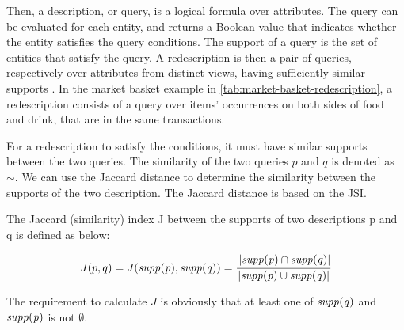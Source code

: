 Then, a description, or query, is a logical formula over attributes.
The query can be evaluated for each entity, and returns a Boolean value that indicates whether the entity satisfies the query conditions.
The support of a query is the set of entities that satisfy the query.
A redescription is then a pair of queries, respectively over attributes from distinct views, having sufficiently similar supports \cite{galbrun2018redescription}.
In the market basket example in \autoref{tab:market-basket-redescription}, a redescription consists of a query over items' occurrences on both sides of food and drink, that are in the same transactions.

For a redescription to satisfy the conditions, it must have similar supports between the two queries.
The similarity of the two queries $p$ and $q$ is denoted as $\sim$.
We can use the Jaccard distance to determine the similarity between the supports of the two description.
The Jaccard distance is based on the \acl{JSI}.

\begin{definition}
    The Jaccard (similarity) index J between the supports of two descriptions p and q is defined as below:

    \begin{equation}
        J(p, q) = J(\mathit{supp({p})}, \mathit{supp({q})}) = \cfrac{\left|\mathit{supp({p})}\cap \mathit{supp({q})}\right|}{\lvert\mathit{supp({p})}\cup \mathit{supp({q})}\rvert}
    \end{equation}
\end{definition}

The requirement to calculate $J$ is obviously that at least one of $\mathit{supp({q})}$ and $\mathit{supp({p})}$ is not $\emptyset$.



